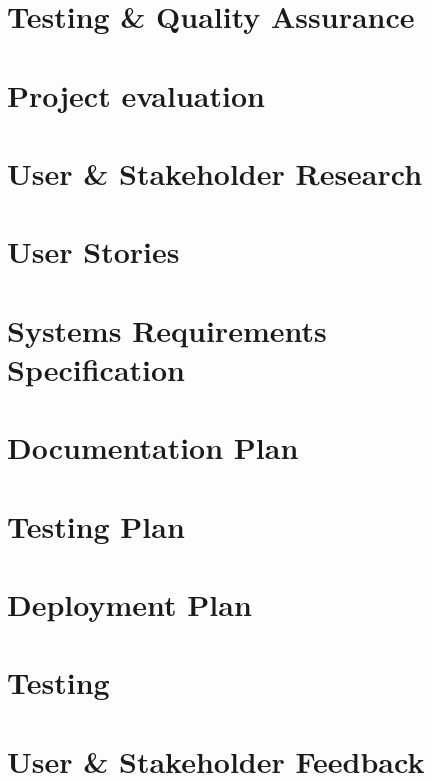 \documentclass[12pt]{report}
\newcommand\blankpage{%
    \null
    \thispagestyle{empty}%
    \addtocounter{page}{-1}%
    \newpage}
\begin{document}
\chapter{Testing \& Quality Assurance}


\chapter{Project evaluation}


\afterpage{\blankpage}

\begin{appendices}

\chapter{User \& Stakeholder Research}


\chapter{User Stories}


\chapter{Systems Requirements Specification}


\chapter{Documentation Plan}


\chapter{Testing Plan}


\chapter{Deployment Plan}


\chapter{Testing}


\chapter{User \& Stakeholder Feedback}


\end{appendices}

\printbibliography
{}

\afterpage{\blankpage}
\end{document}
